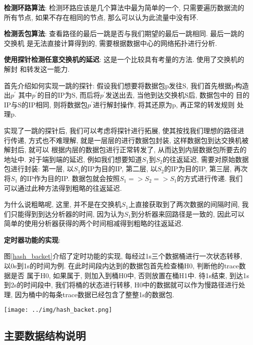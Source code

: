 {\begin{mdframed}[everyline=true]
\textbf{检测环路算法}: 检测环路应该是几个算法中最为简单的一个,
只需要遍历数据流的所有节点, 如果不存在相同的节点,
那么可以认为此流量中没有环.

\textbf{检测丢包算法}: 查看路径的最后一跳是否与我们期望的最后一跳相同.
最后一跳的交换机 是无法直接计算得到的,
需要根据数据中心的网络拓扑进行分析.

\textbf{使用探针检测任意交换机的延迟}: 这是一个比较具有考量的方法.
使用了交换机的解封 和转发这一能力.

首先介绍如何实现一跳的探针: 假设我们想要将数据包p发往S,
我们首先根据p构造出\(p^{'}\) 其中\(p^{'}\)的目的IP为S,
而后将\(p^{'}\)发送出去, 当他到达交换机S后, 数据包中的
目的IP与S的IP相同, 则将数据包\(p^{'}\)进行解封操作, 将其还原为p,
再正常的转发规则 处理p.

实现了一跳的探针后, 我们可以考虑将探针进行拓展,
使其按找我们理想的路径进行传递, 方式也不难理解,
就是一层层的进行数据包封装, 这样数据包到达交换机被解封后, 就可以
根据内层的数据包进行正常转发了, 从而达到内层数据包所要去的地址中.
对于端到端的延迟, 例如我们想要知道\(S_{1}\)到\(S_{2}\)的往返延迟,
需要对原始数据包进行封装: 第一层, 以\(S_{1}\)的IP为目的IP, 第二层,
以\(S_{2}\)的IP为目的IP, 第三层, 再次将\(S_{1}\) 的IP作为目的IP.
数据包就会按照\(S_{1} => S_{2} => S_{1}\)的方式进行传递. 我们
可以通过此种方法得到粗略的往返延迟.

为什么说粗略呢, 这里,
并不是在交换机\(S_{1}\)上直接获取到了两次数据的间隔时间,
我们只能得到到达分析器的时间, 因为认为\(S_{1}\)到分析器来回路径是一致的,
因此可以 简单的使用分析器获得的两个时间相减得到粗略的往返延迟.

\textbf{定时器功能的实现}:

图\ref{hash_backet}介绍了定时功能的实现, 每经过1s三个数据桶进行一次状态转移,
以0s到1s的时间为例. 在此时间段内达到的数据包首先检查桶H0, 判断他的trace数据是否
属于H0, 如果属于, 则加入到桶H0中, 否则放置在桶H1中. 待1s结束, 到达1s到2s的时间段中,
我们将桶的状态进行转移, H0中的数据就可以作为慢路径进行处理,
因为桶中的每条trace数据已经包含了整整1s的数据包.

\begin{center}
    \texttt{[image: ../img/hash\_backet.png]}
    \label{hash_backet}
\end{center}

\subsection{主要数据结构说明}


\end{mdframed}}
